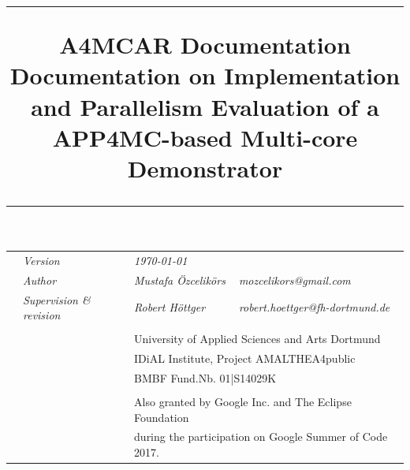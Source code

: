 



\title{\rule{\textwidth}{1pt}
	\textbf{ A4MCAR Documentation} \\ Documentation on Implementation and Parallelism Evaluation of a APP4MC-based Multi-core Demonstrator \rule{\textwidth}{1pt}\vspace{-20pt}}
\date{}

\maketitle 
\setlength{\headsep}{20pt}
\vspace{-20pt}
\hspace{-12pt}

\begin{tabularx}{\textwidth}{Xlll}
	& \textit{Version} & \textit{\today }&\\
	&\textit{Author} &\textit{Mustafa Özcelikörs} & \textit{mozcelikors@gmail.com}\\
	&\textit{Supervision \& revision} &\textit{Robert Höttger} &\textit{robert.hoettger@fh-dortmund.de}\\ \\
	
	&&\multicolumn{2}{l}{University of Applied Sciences and Arts Dortmund}\\ 
	&&\multicolumn{2}{l}{IDiAL Institute, Project AMALTHEA4public}\\
	&&\multicolumn{2}{l}{BMBF  	Fund.Nb. 01|S14029K}  \\ \\
	&&\multicolumn{2}{l}{Also granted by Google Inc. and The Eclipse Foundation}\\ 
	&&\multicolumn{2}{l}{during the participation on Google Summer of Code 2017.}\\
\end{tabularx} 
\vspace{15pt}\\

